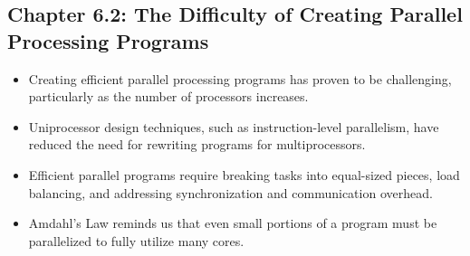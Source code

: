 \documentclass[12pt]{article}
\begin{document}
\subsection*{Chapter 6.2: The Difficulty of Creating Parallel Processing Programs}
\begin{itemize}
    \item Creating efficient parallel processing programs has proven to be challenging, particularly as the number of processors increases.
    \item Uniprocessor design techniques, such as instruction-level parallelism, have reduced the need for rewriting programs for multiprocessors.
    \item Efficient parallel programs require breaking tasks into equal-sized pieces, load balancing, and addressing synchronization and communication overhead.
    \item Amdahl's Law reminds us that even small portions of a program must be parallelized to fully utilize many cores.
\end{itemize}
\end{document}

